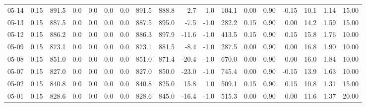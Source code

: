 \begin{threeparttable}
{\begin{tabular}{lrrrrrrrrrrrrrrrrr}
  05-14 &     0.15 & 891.5 &               0.0 &               0.0 &                0.0 &                0.0 & 891.5 & 888.8 &        2.7 &                      1.0 &               104.1 &       0.00 &      0.90 &          -0.15 &             10.1 &            1.14 &                  15.00 \\
  05-13 &     0.15 & 887.5 &               0.0 &               0.0 &                0.0 &                0.0 & 887.5 & 895.0 &       -7.5 &                     -1.0 &               282.2 &       0.15 &      0.90 &           0.00 &             14.2 &            1.59 &                  15.00 \\
  05-12 &     0.15 & 886.2 &               0.0 &               0.0 &                0.0 &                0.0 & 886.3 & 897.9 &      -11.6 &                     -1.0 &               413.5 &       0.15 &      0.90 &           0.15 &             15.8 &            1.76 &                  10.00 \\
  05-09 &     0.15 & 873.1 &               0.0 &               0.0 &                0.0 &                0.0 & 873.1 & 881.5 &       -8.4 &                     -1.0 &               287.5 &       0.00 &      0.90 &           0.00 &             16.8 &            1.90 &                  10.00 \\
  05-08 &     0.15 & 851.0 &               0.0 &               0.0 &                0.0 &                0.0 & 851.0 & 871.4 &      -20.4 &                     -1.0 &               670.0 &       0.00 &      0.90 &           0.00 &             16.0 &            1.84 &                  10.00 \\
  05-07 &     0.15 & 827.0 &               0.0 &               0.0 &                0.0 &                0.0 & 827.0 & 850.0 &      -23.0 &                     -1.0 &               745.4 &       0.00 &      0.90 &          -0.15 &             13.9 &            1.63 &                  10.00 \\
  05-02 &     0.15 & 840.8 &               0.0 &               0.0 &                0.0 &                0.0 & 840.8 & 825.0 &       15.8 &                      1.0 &               509.1 &       0.15 &      0.90 &           0.15 &             10.8 &            1.31 &                  15.00 \\
  05-01 &     0.15 & 828.6 &               0.0 &               0.0 &                0.0 &                0.0 & 828.6 & 845.0 &      -16.4 &                     -1.0 &               515.3 &       0.00 &      0.90 &           0.00 &             11.6 &            1.37 &                  20.00 \\

\end{tabular}}
\end{threeparttable}

